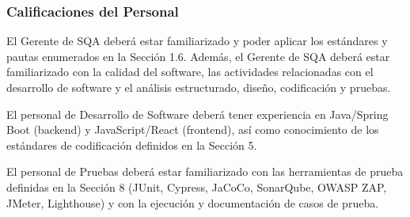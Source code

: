 \subsubsection{ Calificaciones del Personal}

El Gerente de SQA deberá estar familiarizado y poder aplicar los estándares y pautas enumerados en la Sección 1.6. Además, el Gerente de SQA deberá estar familiarizado con la calidad del software, las actividades relacionadas con el desarrollo de software y el análisis estructurado, diseño, codificación y pruebas.

El personal de Desarrollo de Software deberá tener experiencia en Java/Spring Boot (backend) y JavaScript/React (frontend), así como conocimiento de los estándares de codificación definidos en la Sección 5.

El personal de Pruebas deberá estar familiarizado con las herramientas de prueba definidas en la Sección 8 (JUnit, Cypress, JaCoCo, SonarQube, OWASP ZAP, JMeter, Lighthouse) y con la ejecución y documentación de casos de prueba.